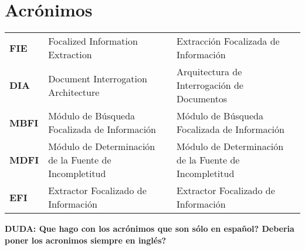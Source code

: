 \chapter*{Acrónimos}

\newcommand{\TERM}[3]{
	\textbf{#1} & #3 & #2 \\[5pt]
}

\begin{longtable}{p{1in}p{2.2in}p{3in}}

		\TERM{FIE}{Extracción Focalizada de Información}{Focalized Information Extraction}
		\TERM{DIA}{Arquitectura de Interrogación de Documentos}{Document Interrogation Architecture}
		\TERM{MBFI}{Módulo de Búsqueda Focalizada de Información}{Módulo de Búsqueda Focalizada de Información}
		\TERM{MDFI}{Módulo de Determinación de la Fuente de Incompletitud}{Módulo de Determinación de la Fuente de Incompletitud}		
		\TERM{EFI}{Extractor Focalizado de Información}{Extractor Focalizado de Información}								

\end{longtable}

		\textbf{DUDA: Que hago con los acrónimos que son sólo en español? Deberia poner los acronimos siempre en inglés?}
		
\newpage
